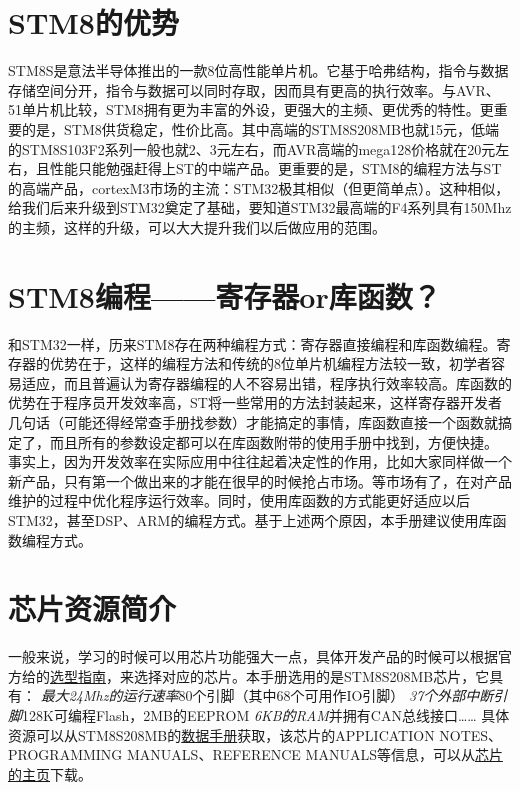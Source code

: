 \documentclass[a4paper]{book}
\begin{document}
\section{STM8的优势}

STM8S是意法半导体推出的一款8位高性能单片机。它基于哈弗结构，指令与数据存储空间分开，指令与数据可以同时存取，因而具有更高的执行效率。与AVR、51单片机比较，STM8拥有更为丰富的外设，更强大的主频、更优秀的特性。更重要的是，STM8供货稳定，性价比高。其中高端的STM8S208MB也就15元，低端的STM8S103F2系列一般也就2、3元左右，而AVR高端的mega128价格就在20元左右，且性能只能勉强赶得上ST的中端产品。更重要的是，STM8的编程方法与ST的高端产品，cortexM3市场的主流：STM32极其相似（但更简单点）。这种相似，给我们后来升级到STM32奠定了基础，要知道STM32最高端的F4系列具有150Mhz的主频，这样的升级，可以大大提升我们以后做应用的范围。

\section{STM8编程------寄存器or库函数？}

和STM32一样，历来STM8存在两种编程方式：寄存器直接编程和库函数编程。寄存器的优势在于，这样的编程方法和传统的8位单片机编程方法较一致，初学者容易适应，而且普遍认为寄存器编程的人不容易出错，程序执行效率较高。库函数的优势在于程序员开发效率高，ST将一些常用的方法封装起来，这样寄存器开发者几句话（可能还得经常查手册找参数）才能搞定的事情，库函数直接一个函数就搞定了，而且所有的参数设定都可以在库函数附带的使用手册中找到，方便快捷。 事实上，因为开发效率在实际应用中往往起着决定性的作用，比如大家同样做一个新产品，只有第一个做出来的才能在很早的时候抢占市场。等市场有了，在对产品维护的过程中优化程序运行效率。同时，使用库函数的方式能更好适应以后STM32，甚至DSP、ARM的编程方式。基于上述两个原因，本手册建议使用库函数编程方式。

\section{芯片资源简介}

一般来说，学习的时候可以用芯片功能强大一点，具体开发产品的时候可以根据官方给的\href{http://www.st.com/internet/com/SALES\_AND\_MARKETING\_RESOURCES/MARKETING\_COMMUNICATION/MARKETING\_BROCHURE/brstm8.pdf}{选型指南}，来选择对应的芯片。本手册选用的是STM8S208MB芯片，它具有： \emph{最大24Mhz的运行速率}80个引脚（其中68个可用作IO引脚） \emph{37个外部中断引脚}128K可编程Flash，2MB的EEPROM \emph{6KB的RAM}并拥有CAN总线接口\ldots{}\ldots{} 具体资源可以从STM8S208MB的\href{http://www.st.com/internet/com/TECHNICAL\_RESOURCES/TECHNICAL\_LITERATURE/DATASHEET/CD00197787.pdf}{数据手册}获取，该芯片的APPLICATION NOTES、PROGRAMMING MANUALS、REFERENCE MANUALS等信息，可以从\href{http://www.st.com/internet/mcu/product/190232.jsp}{芯片的主页}下载。
\end{document}
